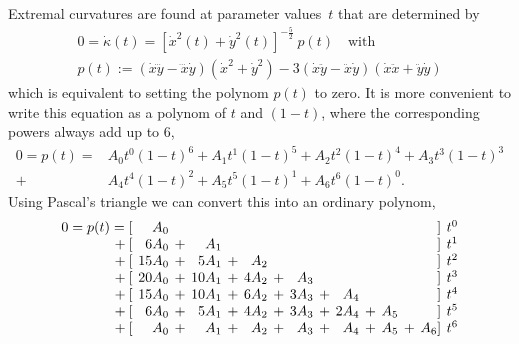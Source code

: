 \documentclass{article}
\begin{document}
Extremal curvatures are found at parameter values~$t$ that are determined by
%
\begin{gather}
  0 = \dot\kappa(t) = [\dot x^2(t) + \dot y^2(t)]^{-\frac{5}{2}}\: p(t) \quad\text{with}\\
  p(t) := (\dot x\dddot y - \dddot x\dot y)(\dot x^2 + \dot y^2)
       - 3(\dot x\ddot y - \ddot x\dot y)(\dot x\ddot x + \ddot y\dot y)
\end{gather}
%
which is equivalent to setting the polynom $p(t)$ to zero.
It is more convenient to write this equation as a polynom of $t$ and $(1{-}t)$,
where the corresponding powers always add up to 6,
%
\begin{equation}
  \begin{aligned}
  0 = p(t) = {}
       &A_0 t^0 (1{-}t)^6
    +   A_1 t^1 (1{-}t)^5
    +   A_2 t^2 (1{-}t)^4
    +   A_3 t^3 (1{-}t)^3 \\
  {}+{}&A_4 t^4 (1{-}t)^2
    +   A_5 t^5 (1{-}t)^1
    +   A_6 t^6 (1{-}t)^0.
  \end{aligned}
\end{equation}
%
Using Pascal's triangle we can convert this into an ordinary polynom,
%
\begin{equation}
  \setlength\arraycolsep{2pt}
  \begin{array}{rrrrrrrrrrrrrrr}
  0 = p(t) = [&    A_0 & &        & &       & &       & &       & &     & &    ] & t^0 \\
        {} + [&  6 A_0 &+&    A_1 & &       & &       & &       & &     & &    ] & t^1 \\
        {} + [& 15 A_0 &+&  5 A_1 &+&   A_2 & &       & &       & &     & &    ] & t^2 \\
        {} + [& 20 A_0 &+& 10 A_1 &+& 4 A_2 &+&   A_3 & &       & &     & &    ] & t^3 \\
        {} + [& 15 A_0 &+& 10 A_1 &+& 6 A_2 &+& 3 A_3 &+&   A_4 & &     & &    ] & t^4 \\
        {} + [&  6 A_0 &+&  5 A_1 &+& 4 A_2 &+& 3 A_3 &+& 2 A_4 &+& A_5 & &    ] & t^5 \\
        {} + [&    A_0 &+&    A_1 &+&   A_2 &+&   A_3 &+&   A_4 &+& A_5 &+& A_6] & t^6
  \end{array}
\end{equation}
%
\end{document}

